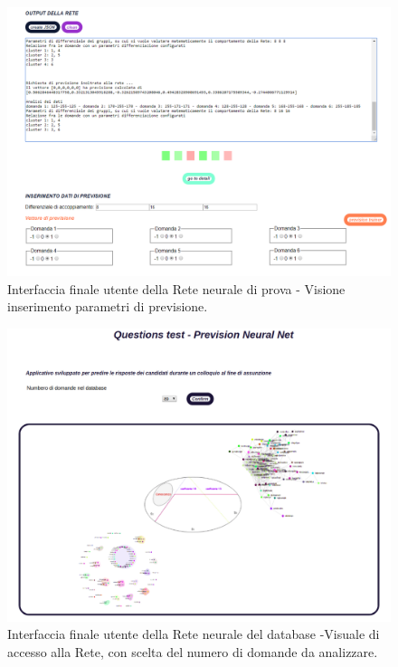 \begin{figure}[H]
\centering
	\includegraphics[width=1\linewidth]{./image/Rete-di-prova_finale3.png}
	\caption{Interfaccia finale utente della Rete neurale di prova - Visione inserimento parametri di previsione.}
	\label{Interfaccia finale utente della Rete neurale di prova - 3.}
\end{figure}
\noindent

\begin{figure}[H]
\centering
	\includegraphics[width=1\linewidth]{./image/first_index.png}
	\caption{Interfaccia finale utente della Rete neurale del database -Visuale di accesso alla Rete, con scelta del numero di domande da analizzare.}
	\label{Interfaccia finale utente della Rete neurale del database -Visuale di accesso alla Rete, con scelta del numero di domande da analizzare.}
\end{figure}
\noindent

